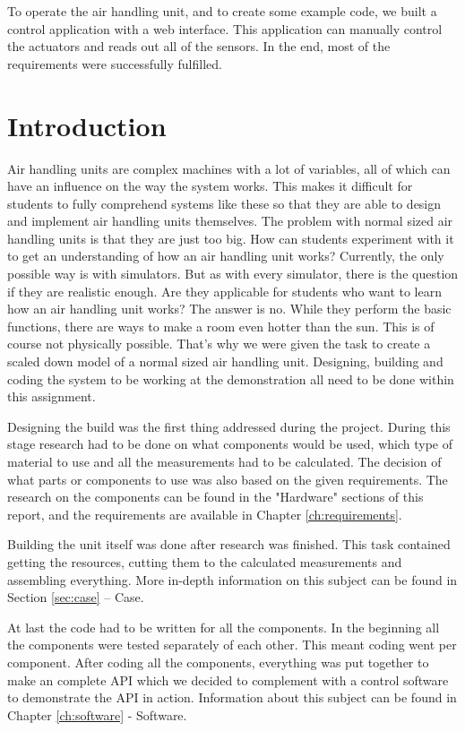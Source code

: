 \documentclass[a4paper,oneside]{book}
\begin{document}
To operate the air handling unit, and to create some example code, we built a
control application with a web interface. This application can manually control
the actuators and reads out all of the sensors. In the end, most of the
requirements were successfully fulfilled.


\chapter*{Introduction}
Air handling units are complex machines with a lot of variables, all of which
can have an influence on the way the system works. This makes it difficult for
students to fully comprehend systems like these so that they are able to design
and implement air handling units themselves. The problem with normal sized air
handling units is that they are just too big. How can students experiment with
it to get an understanding of how an air handling unit works? Currently, the
only possible way is with simulators. But as with every simulator, there is the
question if they are realistic enough. Are they applicable for students who
want to learn how an air handling unit works? The answer is no. While they
perform the basic functions, there are ways to make a room even hotter than the
sun. This is of course not physically possible. That's why we were given the
task to create a scaled down model of a normal sized air handling unit.
Designing, building and coding the system to be working at the demonstration
all need to be done within this assignment.

Designing the build was the first thing addressed during the project. During
this stage research had to be done on what components would be used, which type
of material to use and all the measurements had to be calculated. The decision
of what parts or components to use was also based on the given requirements.
The research on the components can be found in the "Hardware" sections of this
report, and the requirements are available in Chapter \ref{ch:requirements}.

Building the unit itself was done after research was finished. This task
contained getting the resources, cutting them to the calculated measurements
and assembling everything. More in-depth information on this subject can be
found in Section \ref{sec:case} -- Case.

At last the code had to be written for all the components. In the beginning all
the components were tested separately of each other. This meant coding went per
component. After coding all the components, everything was put together to make
an complete API which we decided to complement with a control software to
demonstrate the API in action. Information about this subject can be found in
Chapter \ref{ch:software} - Software.
\end{document}
